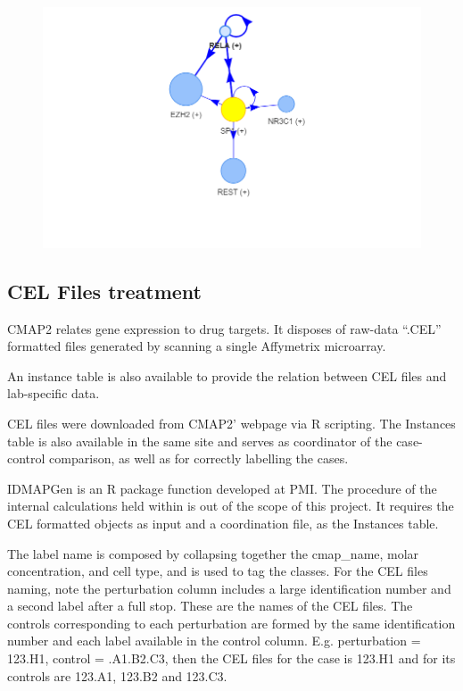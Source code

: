 \begin{figure}[!h]
    \centering
    \includegraphics[width=\textwidth, height=\textheight, keepaspectratio]{Major Thesis/figures/iut/graph/iCESS6m50-SP1.png}
    \caption{}
\end{figure}

\subsection{CEL Files treatment}
CMAP2 \cite{Subramanian2017AProfiles} relates gene expression to drug targets. It disposes of raw-data “.CEL” formatted files generated by scanning a single Affymetrix microarray.

An instance table is also available to provide the relation between CEL files and lab-specific data.

CEL files were downloaded from CMAP2’ webpage via R scripting. The Instances table is also available in the same site and serves as coordinator of the case-control comparison, as well as for correctly labelling the cases.

IDMAPGen is an R package function developed at PMI. The procedure of the internal calculations held within is out of the scope of this project. It requires the CEL formatted objects as input and a coordination file, as the Instances table.

The label name is composed by collapsing together the cmap\_name, molar concentration, and cell type, and is used to tag the classes. For the CEL files naming, note the perturbation column includes a large identification number and a second label after a full stop. These are the names of the CEL files. The controls corresponding to each perturbation are formed by the same identification number and each label available in the control column. E.g. perturbation = 123.H1, control = .A1.B2.C3, then the CEL files for the case is 123.H1 and for its controls are 123.A1, 123.B2 and 123.C3. 

